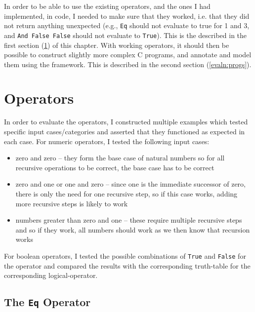 In order to be able to use the existing operators, and the ones I had implemented, in code, I needed to make sure that they worked, i.e. that they did not return anything unexpected (e.g., \texttt{Eq} should not evaluate to true for 1 and 3, and \texttt{And False False} should not evaluate to \texttt{True}). This is the described in the first section (\ref{evaln:ops}) of this chapter. With working operators, it should then be possible to construct slightly more complex C programs, and annotate and model them using the framework. This is described in the second section (\ref{evaln:progs}).


\section{Operators}\label{evaln:ops}
    In order to evaluate the operators, I constructed multiple examples which tested specific input cases/categories and asserted that they functioned as expected in each case. For numeric operators, I tested the following input cases:
    \begin{itemize}
        \item zero and zero -- they form the base case of natural numbers so for
              all recursive operations to be correct, the base case has to be correct
        \item zero and one or one and zero -- since one is the immediate
              successor of zero, there is only the need for one recursive step,
              so if this case works, adding more recursive steps is likely to 
              work
        \item numbers greater than zero and one -- these require multiple 
              recursive steps and so if they work, all numbers should work as
              we then know that recursion works
    \end{itemize}
    
    For boolean operators, I tested the possible combinations of \texttt{True} and \texttt{False} for the operator and compared the results with the corresponding truth-table for the corresponding logical-operator.
	
    \subsection{The \texttt{Eq} Operator}
    
